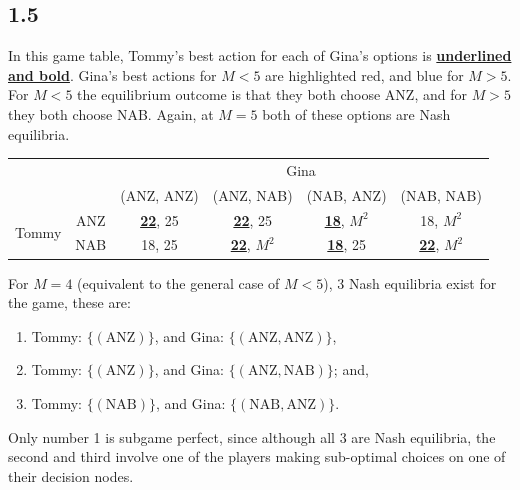 \documentclass{article}
\begin{document}
\subsection*{1.5} In this game table, Tommy's best action for each of Gina's options is \underline{\textbf{underlined and bold}}. Gina's best actions for $M<5$ are highlighted {\color{red}red}, and {\color{blue}blue} for $M>5$. For $M<5$ the equilibrium outcome is that they both choose ANZ, and for $M>5$ they both choose NAB. Again, at $M=5$ both of these options are Nash equilibria.
\begin{table}[H]
    \centering
    \begin{tabular}{cccccc}
                                                    &                          & \multicolumn{4}{c}{Gina}                                                                                                              \\ \cline{3-6} 
                                                    & \multicolumn{1}{c|}{}    & \multicolumn{1}{c|}{(ANZ, ANZ)} & \multicolumn{1}{c|}{(ANZ, NAB)} & \multicolumn{1}{c|}{(NAB, ANZ)} & \multicolumn{1}{c|}{(NAB, NAB)} \\ \cline{2-6} 
        \multicolumn{1}{c|}{\multirow{2}{*}{Tommy}} & \multicolumn{1}{c|}{ANZ} & \multicolumn{1}{c|}{\underline{\textbf{22}}, {\color{red}25}}     & \multicolumn{1}{c|}{\underline{\textbf{22}}, {\color{red}25}}     & \multicolumn{1}{c|}{\underline{\textbf{18}}, {\color{blue}$M^2$}}  & \multicolumn{1}{c|}{18, {\color{blue}$M^2$}}  \\ \cline{2-6} 
        \multicolumn{1}{c|}{}                       & \multicolumn{1}{c|}{NAB} & \multicolumn{1}{c|}{18, {\color{red}25}}     & \multicolumn{1}{c|}{\underline{\textbf{22}}, {\color{blue}$M^2$}}  & \multicolumn{1}{c|}{\underline{\textbf{18}}, {\color{red}25}}     & \multicolumn{1}{c|}{\underline{\textbf{22}}, {\color{blue}$M^2$}}  \\ \cline{2-6} 
    \end{tabular}
\end{table}
\noindent For $M=4$ (equivalent to the general case of $M<5$), 3 Nash equilibria exist for the game, these are:
\begin{enumerate}
    \item Tommy: $\{(\mbox{ANZ})\}$, and Gina: $\{(\mbox{ANZ}, \mbox{ANZ})\}$,
    \item Tommy: $\{(\mbox{ANZ})\}$, and Gina: $\{(\mbox{ANZ}, \mbox{NAB})\}$; and,
    \item Tommy: $\{(\mbox{NAB})\}$, and Gina: $\{(\mbox{NAB}, \mbox{ANZ})\}$.
\end{enumerate}
Only number 1 is subgame perfect, since although all 3 are Nash equilibria, the second and third involve one of the players making sub-optimal choices on one of their decision nodes.
\end{document}
